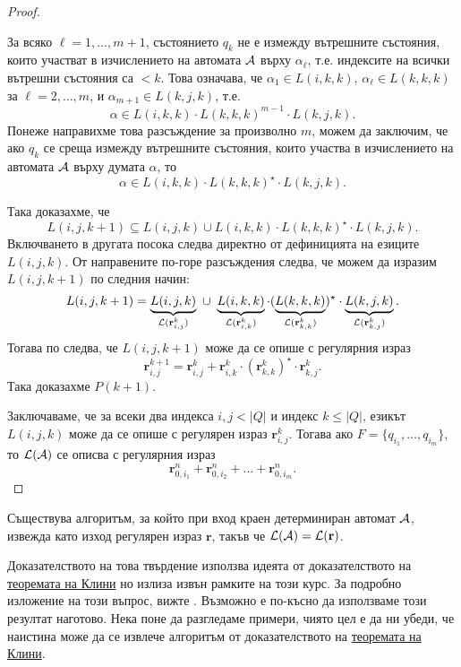 \begin{proof}
\begin{enumerate}[a)]
\begin{itemize}
      За всяко $\ell=1,\dots,m+1$, състоянието $q_k$ не е измежду вътрешните състояния, които участват в изчислението на автомата $\mathcal{A}$ върху $\alpha_\ell$, т.е. индексите на всички вътрешни състояния са $<k$.
      Това означава, че $\alpha_1 \in L(i,k,k)$, $\alpha_\ell \in L(k,k,k)$ за $\ell=2,\dots,m$, и $\alpha_{m+1} \in L(k,j,k)$, т.е.
      \[\alpha \in L(i,k,k) \cdot L(k,k,k)^{m-1} \cdot L(k,j,k).\]
      Понеже направихме това разсъждение за произволно $m$,
      можем да заключим, че ако $q_k$ се среща измежду вътрешните състояния, които участва в изчислението на автомата $\mathcal{A}$ върху думата $\alpha$,
      то \[\alpha \in L(i,k,k) \cdot L(k,k,k)^\star \cdot L(k,j,k).\]
    \end{itemize}
    Така доказахме, че 
    \[L(i,j,k+1) \subseteq L(i,j,k) \cup L(i,k,k) \cdot L(k,k,k)^\star \cdot L(k,j,k).\]
    Включването в другата посока следва директно от дефиницията на езиците $L(i,j,k)$.
    От направените по-горе разсъждения следва, че можем да изразим $L(i,j,k+1)$ по следния начин:
    \[L(i,j,k+1) = \underbrace{L(i,j,k)}_{\L(\mathbf{r}^{k}_{i,j})}\ \cup\ \underbrace{L(i,k,k)}_{\L(\mathbf{r}^{k}_{i,k})}\cdot (\underbrace{L(k,k,k)}_{\L(\mathbf{r}^{k}_{k,k})})^\star \cdot \underbrace{L(k,j,k)}_{\L(\mathbf{r}^{k}_{k,j})}.\]
    Тогава по \IndHyp следва, че $L(i,j,k+1)$ може да се опише с регулярния израз
    \begin{equation}
      \label{eq:kleene}
      \mathbf{r}^{k+1}_{i,j} = \mathbf{r}^{k}_{i,j} + \mathbf{r}^{k}_{i,k}\cdot (\mathbf{r}^{k}_{k,k})^\star\cdot \mathbf{r}^{k}_{k,j}.
    \end{equation}
    Така доказахме $P(k+1)$.
  \end{enumerate}
  Заключаваме, че за всеки два индекса $i,j < |Q|$ и индекс $k \leq |Q|$, езикът $L(i,j,k)$ може да се опише с регулярен израз $\mathbf{r}^{k}_{i,j}$.
  Тогава ако $F = \{q_{i_1},\dots,q_{i_m}\}$, то $\mathcal{L}(\mathcal{A})$ се описва с регулярния израз
  \[\mathbf{r}^n_{0,i_1} + \mathbf{r}^n_{0,i_2} + \dots + \mathbf{r}^n_{0,i_m}.\]
\end{proof}

\begin{proposition}
  Съществува алгоритъм, за който при вход краен детерминиран автомат $\mathcal{A}$,
  извежда като изход регулярен израз $\mathbf{r}$, такъв че $\mathcal{L}(\mathcal{A}) = \mathcal{L}(\mathbf{r})$.
\end{proposition}

Доказателството на това твърдение използва идеята от доказателството на \hyperref[th:regular:kleene]{теоремата на Клини}
но излиза извън рамките на този курс. За подробно изложение на този въпрос, вижте \cite[стр. 69]{sipser3}.
Възможно е по-късно да използваме този резултат наготово.
Нека поне да разгледаме примери, чиято цел е да ни убеди, 
че наистина може да се извлече алгоритъм от доказателството на \hyperref[th:regular:kleene]{теоремата на Клини}.


